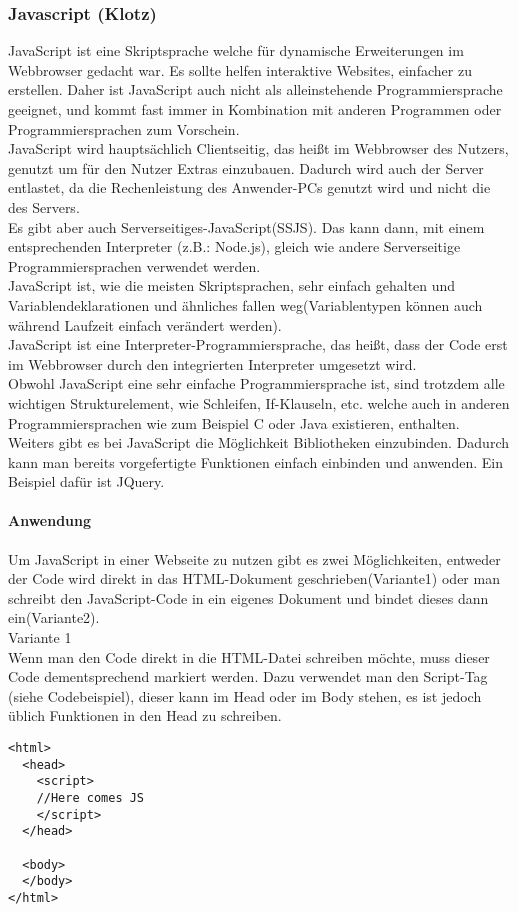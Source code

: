\subsubsection{Javascript (Klotz)}
\label{sec:content_js_Javascript}
JavaScript ist eine Skriptsprache welche für dynamische Erweiterungen im Webbrowser gedacht war. Es sollte helfen interaktive Websites, einfacher zu erstellen. Daher ist JavaScript auch nicht als alleinstehende Programmiersprache geeignet, und kommt fast immer in Kombination mit anderen Programmen oder Programmiersprachen zum Vorschein.\\
JavaScript wird hauptsächlich Clientseitig, das heißt im Webbrowser des Nutzers, genutzt um für den Nutzer Extras einzubauen. Dadurch wird auch der Server entlastet, da die Rechenleistung des Anwender-PCs genutzt wird und nicht die des Servers.\\
 Es gibt aber auch Serverseitiges-JavaScript(SSJS). Das kann dann, mit einem entsprechenden Interpreter (z.B.: Node.js), gleich wie andere Serverseitige Programmiersprachen verwendet werden.\\
JavaScript ist, wie die meisten Skriptsprachen, sehr einfach gehalten und Variablendeklarationen und ähnliches fallen weg(Variablentypen können auch während Laufzeit einfach verändert werden).\\
JavaScript ist eine Interpreter-Programmiersprache, das heißt, dass der Code erst im Webbrowser durch den integrierten Interpreter umgesetzt wird.\\
Obwohl JavaScript eine sehr einfache Programmiersprache ist, sind trotzdem alle wichtigen Strukturelement, wie Schleifen, If-Klauseln, etc. welche auch in anderen Programmiersprachen wie zum Beispiel C oder Java existieren, enthalten.\\
Weiters gibt es bei JavaScript die Möglichkeit Bibliotheken einzubinden. Dadurch kann man bereits vorgefertigte Funktionen einfach einbinden und anwenden. Ein Beispiel dafür ist JQuery.\\

\paragraph*{Anwendung}
Um JavaScript in einer Webseite zu nutzen gibt es zwei Möglichkeiten, entweder der Code wird direkt in das HTML-Dokument geschrieben(Variante1) oder man schreibt den JavaScript-Code in ein eigenes Dokument und bindet dieses dann ein(Variante2).\\
Variante 1\\
Wenn man den Code direkt in die HTML-Datei schreiben möchte, muss dieser Code dementsprechend markiert werden. Dazu verwendet man den Script-Tag (siehe Codebeispiel), dieser kann im Head oder im Body stehen, es ist jedoch üblich Funktionen in den Head zu schreiben.\\
\begin{lstlisting}
<html>
  <head>
    <script>
	//Here comes JS
    </script> 
  </head>
  
  <body>
  </body>
</html>
\end{lstlisting}


